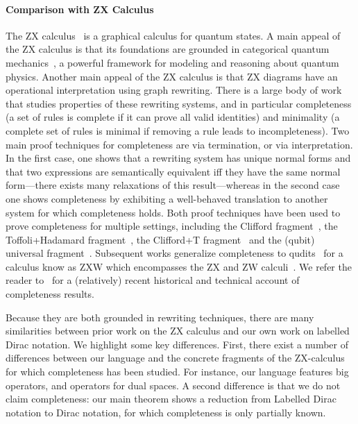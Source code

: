 \paragraph*{Comparison with ZX Calculus}
The ZX calculus~\cite{DBLP:conf/icalp/CoeckeD08,coecke2011interacting}
is a graphical calculus for quantum states. A main appeal of the ZX
calculus is that its foundations are grounded in categorical quantum
mechanics~\cite{DBLP:conf/lics/AbramskyC04}, a powerful framework for
modeling and reasoning about quantum physics. Another main appeal of
the ZX calculus is that ZX diagrams have an operational interpretation
using graph rewriting. There is a large body of work that studies
properties of these rewriting systems, and in particular completeness
(a set of rules is complete if it can prove all valid identities) and
minimality (a complete set of rules is minimal if removing a rule
leads to incompleteness). Two main proof techniques for completeness
are via termination, or via interpretation. In the first case, one
shows that a rewriting system has unique normal forms and that two
expressions are semantically equivalent iff they have the same normal
form---there exists many relaxations of this result---whereas in the
second case one shows completeness by exhibiting a well-behaved
translation to another system for which completeness holds. Both proof
techniques have been used to prove completeness for multiple settings,
including the Clifford fragment~\cite{backens2014zx}, the
Toffoli+Hadamard fragment~\cite{hadzi15zx}, the Clifford+T
fragment~\cite{jeandel2018complete} and the (qubit) universal
fragment~\cite{HNW18,JeandelPV18beyond}. Subsequent works generalize
completeness to qudits~\cite{Poor2023} for a calculus know as ZXW
which encompasses the ZX and ZW calculi~\cite{zwcalculus}. We refer
the reader to~\cite{vandewetering2020zx} for a (relatively) recent
historical and technical account of completeness results.

Because they are both grounded in rewriting techniques, there are many
similarities between prior work on the ZX calculus and our own work on
labelled Dirac notation. We highlight some key differences. First,
there exist a number of differences between our language and the
concrete fragments of the ZX-calculus for which completeness has been
studied. For instance, our language features big operators, and
operators for dual spaces. A second difference is that we do not claim
completeness: our main theorem shows a reduction from Labelled Dirac
notation to Dirac notation, for which completeness is only partially
known.




